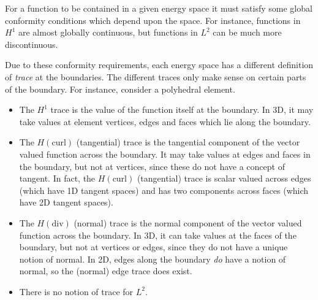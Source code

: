 For a function to be contained in a given energy space it must satisfy some global conformity conditions which depend upon the space.
For instance, functions in $H^1$ are almost globally continuous, but functions in $L^2$ can be much more discontinuous.

Due to these conformity requirements, each energy space has a different definition of \textit{trace} at the boundaries. 
The different traces only make sense on certain parts of the boundary.
For instance, consider a polyhedral element.
\begin{itemize}
	\item The $H^1$ trace is the value of the function itself at the boundary. In 3D, it may take values at element vertices, edges and faces which lie along the boundary.
	\item The $H(\text{curl})$ (tangential) trace is the tangential component of the vector valued function across the boundary. It may take values at edges and faces in the boundary, but not at vertices, since these do not have a concept of tangent. In fact, the $H(\text{curl})$ (tangential) trace is scalar valued across edges (which have 1D tangent spaces) and has two components across faces (which have 2D tangent spaces).
	\item The $H(\text{div})$ (normal) trace is the normal component of the vector valued function across the boundary. In 3D, it can take values at the faces of the boundary, but not at vertices or edges, since they do not have a unique notion of normal. In 2D, edges along the boundary \textit{do} have a notion of normal, so the (normal) edge trace does exist.
	\item There is no notion of trace for $L^2$.
\end{itemize}


